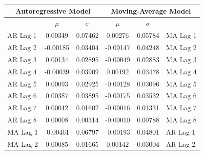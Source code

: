 \documentclass[oneside,12pt,openany]{book}
\begin{document}
		\begin{table}[!ht]
			\centering
			\begin{tabular}{|l|c|c|c|c|l|}
				\hline
				\multicolumn{3}{|c|}{\textbf{Autoregressive Model}}   & \multicolumn{3}{c|}{\textbf{Moving-Average Model}}  \\ \hline
				\cellcolor{black} & $\mu$ & $\sigma$ & $\mu$ & $\sigma$ & \cellcolor{black}         \\ \hline
				AR Lag 1 & 0.00349                  & 0.07462                    & 0.00276                  & 0.05784                    & MA Lag 1 \\ \hline
				AR Lag 2 & -0.00185                 & 0.03404                    & -0.00147                 & 0.04248                    & MA Lag 2 \\ \hline
				AR Lag 3 & 0.00134                  & 0.02895                    & -0.00049                 & 0.02883                    & MA Lag 3 \\ \hline
				AR Lag 4 & -0.00039                 & 0.03909                    & 0.00192                  & 0.03478                    & MA Lag 4 \\ \hline
				AR Lag 5 & 0.00093                  & 0.02925                    & -0.00128                 & 0.03096                    & MA Lag 5 \\ \hline
				AR Lag 6 & 0.00387                  & 0.03895                    & -0.00175                 & 0.03532                    & MA Lag 6 \\ \hline
				AR Lag 7 & 0.00042                  & 0.01602                    & -0.00016                 & 0.01331                    & MA Lag 7 \\ \hline
				AR Lag 8 & 0.00008                  & 0.00314                    & -0.00010                 & 0.00788                    & MA Lag 8 \\ \hline
				MA Lag 1 & -0.00461                 & 0.06797                    & -0.00193                 & 0.04801                    & AR Lag 1 \\ \hline
				MA Lag 2 & 0.00085                  & 0.01665                    & 0.00142                  & 0.03004                    & AR Lag 2 \\ \hline
			\end{tabular}
		\end{table}
	
\end{document}
